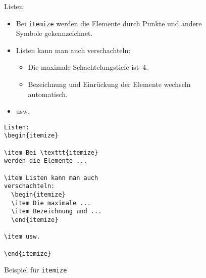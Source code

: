 \begin{figure}[!htbp]
\begin{lminipage}{\textwidth}
\exa
Listen:
\begin{itemize}
\item Bei \texttt{itemize} werden
die Elemente durch Punkte und andere Symbole gekennzeichnet. 
\item Listen kann man auch
verschachteln:
  \begin{itemize}
  \item Die maximale Schachtelungstiefe
  ist~4.
  \item
  Bezeichnung und Einrückung der Elemente
  wechseln automatisch.
  \end{itemize}
\item usw.
\end{itemize}
\exb
\begin{verbatim}
Listen:
\begin{itemize}
 
\item Bei \texttt{itemize}
werden die Elemente ...
 
\item Listen kann man auch
verschachteln:
  \begin{itemize}
  \item Die maximale ...
  \item Bezeichnung und ...
  \end{itemize}
 
\item usw.
 
\end{itemize}
\end{verbatim}
\exc
\end{lminipage}
\caption{Beispiel für \texttt{itemize}} \label{item}
\end{figure}


